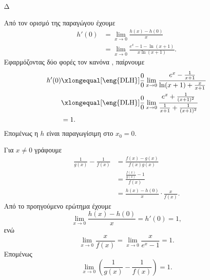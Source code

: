 \begin{thema}{Δ}
\begin{erwthma}
Από τον ορισμό της παραγώγου έχουμε
\begin{align*}
h'(0)
&=\lim_{x\to0}\frac{h(x)-h(0)}{x}\\
&=\lim_{x\to0}
\frac{e^x-1-\ln(x+1)}
{x\ln(x+1)}.
\end{align*}
Εφαρμόζοντας δύο φορές τον κανόνα , παίρνουμε
\begin{align*}
h'(0)
&\xlongequal[\text{\eng{DLH}}]{\frac{0}{0}}
\lim_{x\to0}
\frac{e^x-\frac{1}{x+1}}
{\ln(x+1)+\frac{x}{x+1}}\\
&\xlongequal[\text{\eng{DLH}}]{\frac{0}{0}}
\lim_{x\to0}
\frac{e^x+\frac{1}{(x+1)^2}}
{\frac{1}{x+1}+\frac{1}{(x+1)^2}}\\
&={1}.
\end{align*}
Επομένως η $h$ είναι παραγωγίσιμη στο $x_0=0$.

\item Για $x\neq0$ γράφουμε
\begin{align*}
\frac{1}{g(x)}-\frac{1}{f(x)}
&=\frac{f(x)-g(x)}{f(x)g(x)}\\
&=\frac{\frac{f(x)}{g(x)}-1}{f(x)}\\
&=\frac{h(x)-h(0)}{x}\cdot\frac{x}{f(x)}.
\end{align*}
Από το προηγούμενο ερώτημα έχουμε
\[
\lim_{x\to0}\frac{h(x)-h(0)}{x}=h'(0)=1,
\]
ενώ
\[
\lim_{x\to0}\frac{x}{f(x)}
=\lim_{x\to0}\frac{x}{e^x-1}
=1.
\]
Επομένως
\[
{
\lim_{x\to0}
\left(
\frac{1}{g(x)}-\frac{1}{f(x)}
\right)=1}.
\]
\end{erwthma}
\end{thema}
